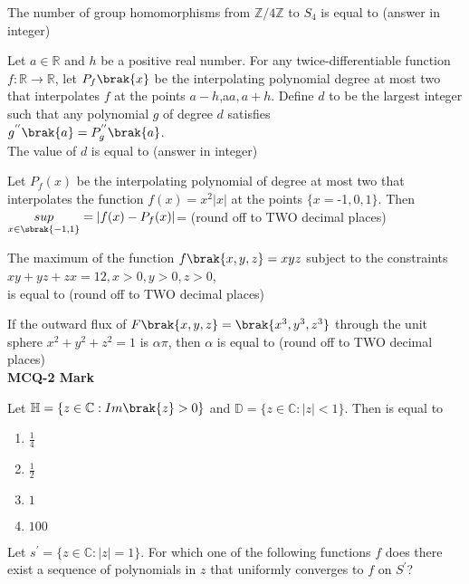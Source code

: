     \item  The number of group homomorphisms from $\mathbb{Z}/4\mathbb{Z}$ to $S_4$ is equal to \underline{\hspace{1.5cm}}(answer in integer)
    \item Let $a\in\mathbb{R}$ and $h$ be a positive real number. For any twice-differentiable function $f:\mathbb{R}\rightarrow\mathbb{R}$, let $P_f\brak{x}$ be the interpolating polynomial degree at most two that interpolates $f$ at the points $a-h$,a$a,a+h$. Define $d$ to be the largest integer such that any polynomial $g$ of degree $d$ satisfies\\
    $g^{''}\brak{a}=P^{''}_g\brak{a}$.\\The value of $d$ is equal to \underline{\hspace{2cm}}(answer in integer)
    \item Let $P_f(x)$ be the interpolating polynomial of degree at most two that interpolates the function $f(x) = x^2|x|$ at the points $\{x = $-1$, 0, 1\}$. Then\\
        ${\underset{x\in\sbrak{-1,1}}{sup}}=|f(x) - P_f(x)|$=
        \underline{\hspace{1.5cm}}(round off to TWO decimal places)
    \item The maximum of the function $f\brak{x,y,z}=xyz$ subject to the constraints\\$xy+yz+zx=12,x>0,y>0,z>0$,\\is equal to \underline{\hspace{1.5cm}}(round off to TWO decimal places)
    \item If the outward flux of $F\brak{x,y,z}=\brak{x^3,y^3,z^3}$ through the unit sphere $x^2+y^2+z^2=1$ is $\alpha\pi$, then $\alpha$ is equal to \underline{\hspace{1.5cm}}(round off to TWO decimal places)\\
    \textbf{MCQ-2 Mark}
    \item Let $\mathbb{H}=\{z\in\mathbb{C}: Im\brak{z}>0\}$ and $\mathbb{D}=\{z\in\mathbb{C}: |z|<1\}$. Then is equal to 
    \begin{enumerate}
        \item $\frac{1}{4}$
        \item $\frac{1}{2}$
        \item $1$
        \item $100$
    \end{enumerate} 
    \item Let $s^{\prime}=\{z\in\mathbb{C}:|z|=1\}$. For which one of the following functions $f$ does there exist a sequence of polynomials in $z$ that uniformly converges to $f$ on $S^\prime$?
